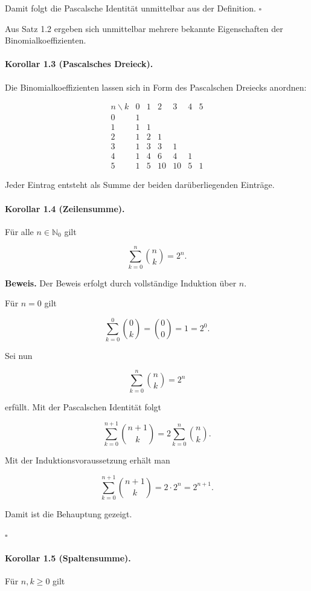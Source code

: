 \documentclass{article}
\begin{document}
Damit folgt die Pascalsche Identität unmittelbar aus der Definition.
\hfill\(\square\)

Aus Satz 1.2 ergeben sich unmittelbar mehrere bekannte Eigenschaften der Binomialkoeffizienten.

\paragraph{Korollar 1.3 (Pascalsches Dreieck).}
Die Binomialkoeffizienten lassen sich in Form des Pascalschen Dreiecks anordnen:

\[
\begin{array}{c|cccccc}
n\backslash k & 0&1&2&3&4&5\\ \hline
0&1\\
1&1&1\\
2&1&2&1\\
3&1&3&3&1\\
4&1&4&6&4&1\\
5&1&5&10&10&5&1
\end{array}
\]

Jeder Eintrag entsteht als Summe der beiden darüberliegenden Einträge.

\paragraph{Korollar 1.4 (Zeilensumme).}
Für alle \(n\in\mathbb N_0\) gilt

\[
\sum_{k=0}^{n}\binom{n}{k}=2^n.
\]

\textbf{Beweis.}
Der Beweis erfolgt durch vollständige Induktion über \(n\).

Für \(n=0\) gilt

\[
\sum_{k=0}^{0}\binom{0}{k}
=
\binom{0}{0}
=
1
=
2^0.
\]

Sei nun

\[
\sum_{k=0}^{n}\binom{n}{k}=2^n
\]

erfüllt. Mit der Pascalschen Identität folgt

\[
\sum_{k=0}^{n+1}\binom{n+1}{k}
=
2\sum_{k=0}^{n}\binom{n}{k}.
\]

Mit der Induktionsvoraussetzung erhält man

\[
\sum_{k=0}^{n+1}\binom{n+1}{k}
=
2\cdot 2^n
=
2^{n+1}.
\]

Damit ist die Behauptung gezeigt.

\hfill\(\square\)

\paragraph{Korollar 1.5 (Spaltensumme).}
Für \(n,k\ge 0\) gilt
\end{document}
